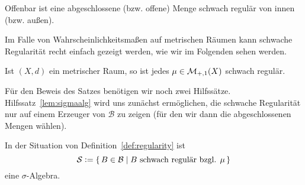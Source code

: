 \documentclass[../main/main.tex]{subfiles}
\begin{document}
	Offenbar ist eine abgeschlossene (bzw. offene) Menge schwach regulär von innen (bzw. außen).

	Im Falle von Wahrscheinlichkeitsmaßen auf metrischen Räumen kann schwache Regularität 
	recht einfach gezeigt werden, wie wir im Folgenden sehen werden.

	\begin{Satz}
		\label{thm:weakregularity}
		Ist $(X, d)$ ein metrischer Raum, so ist jedes $\mu \in \mathcal{M}_{+,1}(X)$ schwach regulär.
	\end{Satz}

	Für den Beweis des Satzes benötigen wir noch zwei Hilfssätze. Hilfssatz~\ref{lem:sigmaalg} wird 
	uns zunächst ermöglichen, die schwache Regularität nur auf einem Erzeuger von $\mathcal{B}$ 
	zu zeigen (für den wir dann die abgeschlossenen Mengen wählen).
	
	\begin{Hilfssatz}
		\label{lem:sigmaalg}
		In der Situation von Definition~\ref{def:regularity} ist
		$$\mathcal{S} \vcentcolon = \left\{\, B \in \mathcal{B} \; | \; B \text{ schwach regulär bzgl. } \mu \,\right\}$$
		eine $\sigma$-Algebra.
	\end{Hilfssatz}
	
\end{document}
